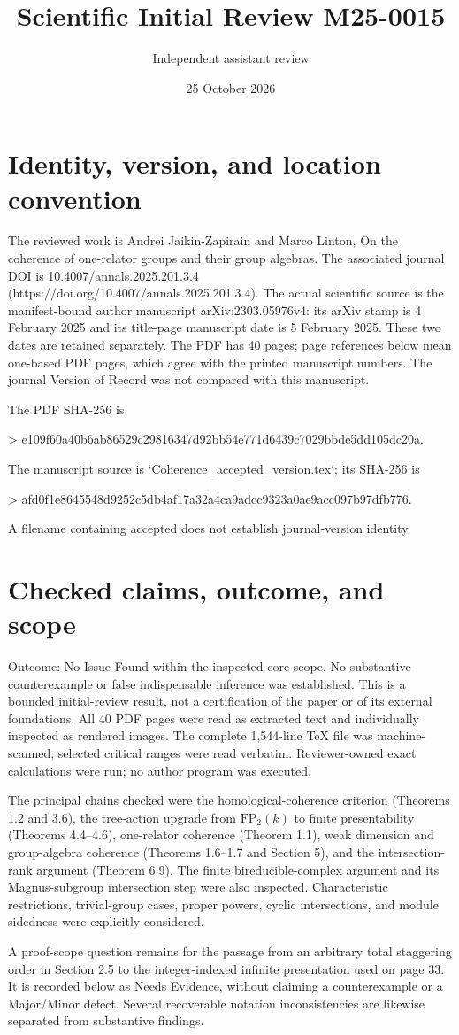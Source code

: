 \documentclass[10pt]{article}
\title{Scientific Initial Review
M25-0015}
\author{Independent assistant review}
\date{25 October 2026}
\begin{document}
\maketitle
\section*{Identity, version, and location convention}
The reviewed work is Andrei Jaikin-Zapirain and Marco Linton, On the coherence of one-relator groups and their group algebras. The associated journal DOI is 10.4007/annals.2025.201.3.4 (https://doi.org/10.4007/annals.2025.201.3.4). The actual scientific source is the manifest-bound author manuscript arXiv:2303.05976v4: its arXiv stamp is 4 February 2025 and its title-page manuscript date is 5 February 2025. These two dates are retained separately. The PDF has 40 pages; page references below mean one-based PDF pages, which agree with the printed manuscript numbers. The journal Version of Record was not compared with this manuscript.\par
The PDF SHA-256 is\par
> e109f60a40b6ab86529c29816347d92bb54e771d6439c7029bbde5dd105dc20a.\par
The manuscript source is `Coherence\_accepted\_version.tex`; its SHA-256 is\par
> afd0f1e8645548d9252c5db4af17a32a4ca9adcc9323a0ae9acc097b97dfb776.\par
A filename containing accepted does not establish journal-version identity.\par
\section*{Checked claims, outcome, and scope}
Outcome: No Issue Found within the inspected core scope. No substantive counterexample or false indispensable inference was established. This is a bounded initial-review result, not a certification of the paper or of its external foundations. All 40 PDF pages were read as extracted text and individually inspected as rendered images. The complete 1,544-line TeX file was machine-scanned; selected critical ranges were read verbatim. Reviewer-owned exact calculations were run; no author program was executed.\par
The principal chains checked were the homological-coherence criterion (Theorems 1.2 and 3.6), the tree-action upgrade from \(\mathrm{FP}_2(k)\) to finite presentability (Theorems 4.4–4.6), one-relator coherence (Theorem 1.1), weak dimension and group-algebra coherence (Theorems 1.6–1.7 and Section 5), and the intersection-rank argument (Theorem 6.9). The finite bireducible-complex argument and its Magnus-subgroup intersection step were also inspected. Characteristic restrictions, trivial-group cases, proper powers, cyclic intersections, and module sidedness were explicitly considered.\par
A proof-scope question remains for the passage from an arbitrary total staggering order in Section 2.5 to the integer-indexed infinite presentation used on page 33. It is recorded below as Needs Evidence, without claiming a counterexample or a Major/Minor defect. Several recoverable notation inconsistencies are likewise separated from substantive findings.\par
\end{document}
